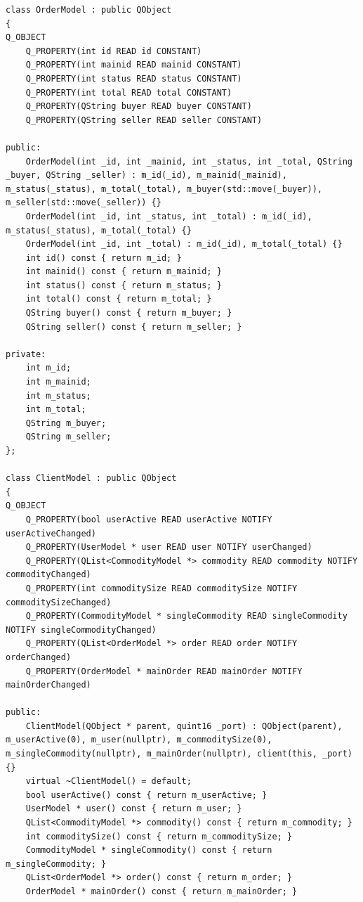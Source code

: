 \documentclass[lang=cn,11pt,a4paper,cite=authornum]{paper}
\begin{document}
\begin{code}
\begin{verbatim}
class OrderModel : public QObject
{
Q_OBJECT
    Q_PROPERTY(int id READ id CONSTANT)
    Q_PROPERTY(int mainid READ mainid CONSTANT)
    Q_PROPERTY(int status READ status CONSTANT)
    Q_PROPERTY(int total READ total CONSTANT)
    Q_PROPERTY(QString buyer READ buyer CONSTANT)
    Q_PROPERTY(QString seller READ seller CONSTANT)
 
public:
    OrderModel(int _id, int _mainid, int _status, int _total, QString _buyer, QString _seller) : m_id(_id), m_mainid(_mainid), m_status(_status), m_total(_total), m_buyer(std::move(_buyer)), m_seller(std::move(_seller)) {}
    OrderModel(int _id, int _status, int _total) : m_id(_id), m_status(_status), m_total(_total) {}
    OrderModel(int _id, int _total) : m_id(_id), m_total(_total) {}
    int id() const { return m_id; }
    int mainid() const { return m_mainid; }
    int status() const { return m_status; }
    int total() const { return m_total; }
    QString buyer() const { return m_buyer; }
    QString seller() const { return m_seller; }
 
private:
    int m_id; 
    int m_mainid; 
    int m_status; 
    int m_total; 
    QString m_buyer; 
    QString m_seller; 
};

class ClientModel : public QObject
{
Q_OBJECT
    Q_PROPERTY(bool userActive READ userActive NOTIFY userActiveChanged)
    Q_PROPERTY(UserModel * user READ user NOTIFY userChanged)
    Q_PROPERTY(QList<CommodityModel *> commodity READ commodity NOTIFY commodityChanged)
    Q_PROPERTY(int commoditySize READ commoditySize NOTIFY commoditySizeChanged)
    Q_PROPERTY(CommodityModel * singleCommodity READ singleCommodity NOTIFY singleCommodityChanged)
    Q_PROPERTY(QList<OrderModel *> order READ order NOTIFY orderChanged)
    Q_PROPERTY(OrderModel * mainOrder READ mainOrder NOTIFY mainOrderChanged)
 
public:
    ClientModel(QObject * parent, quint16 _port) : QObject(parent), m_userActive(0), m_user(nullptr), m_commoditySize(0), m_singleCommodity(nullptr), m_mainOrder(nullptr), client(this, _port) {}
    virtual ~ClientModel() = default;
    bool userActive() const { return m_userActive; }
    UserModel * user() const { return m_user; }
    QList<CommodityModel *> commodity() const { return m_commodity; }
    int commoditySize() const { return m_commoditySize; }
    CommodityModel * singleCommodity() const { return m_singleCommodity; }
    QList<OrderModel *> order() const { return m_order; }
    OrderModel * mainOrder() const { return m_mainOrder; }


\end{verbatim}
\end{code}
\end{document}
